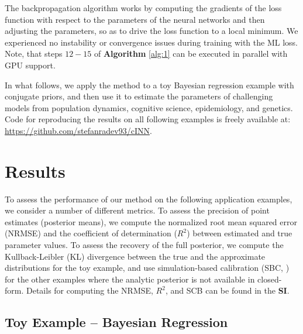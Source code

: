 \documentclass[9pt,twoside,lineno]{pnas-new}
\begin{document}
The backpropagation algorithm works by computing the gradients of the loss function with respect to the parameters of the neural networks and then adjusting the parameters, so as to drive the loss function to a local minimum. We experienced no instability or convergence issues during training with the ML loss. Note, that steps $12-15$ of \textbf{Algorithm} \ref{alg:1} can be executed in parallel with GPU support. 

In what follows, we apply the method to a toy Bayesian regression example with conjugate priors, and then use it to estimate the parameters of challenging models from population dynamics, cognitive science, epidemiology, and genetics. Code for reproducing the results on all following examples is freely available at: \href{https://github.com/stefanradev93/cINN}{https://github.com/stefanradev93/cINN}.

\section*{Results}

To assess the performance of our method on the following application examples, we consider a number of different metrics. To assess the precision of point estimates (posterior means), we compute the normalized root mean squared error (NRMSE) and the coefficient of determination ($R^{2}$) between estimated and true parameter values. To assess the recovery of the full posterior, we compute the Kullback-Leibler (KL) divergence \cite{hershey2007approximating} between the true and the approximate distributions for the toy example, and use simulation-based calibration (SBC, \cite{talts2018validating}) for the other examples where the analytic posterior is not available in closed-form. Details for computing the NRMSE, $R^2$, and SCB can be found in the \textbf{SI}.

\subsection*{Toy Example – Bayesian Regression}
\end{document}
